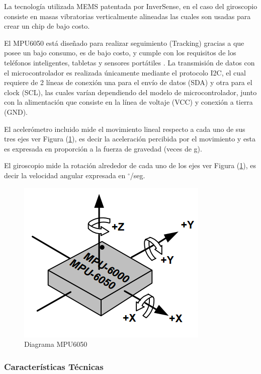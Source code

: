 \documentclass[12pt,a4paper]{article}
\newcommand{\grad}{$^{\circ}$}
\begin{document}
La tecnología utilizada MEMS patentada por InverSense, en el caso del giroscopio consiste en masas vibratorias verticalmente alineadas las cuales son usadas para crear un chip de bajo costo.

El MPU6050 está diseñado para realizar seguimiento (Tracking) gracias a que posee un bajo consumo, es de bajo costo, y cumple con los requisitos de los teléfonos inteligentes, tabletas y sensores portátiles \cite{MPU6050}.
La transmisión de datos con el microcontrolador es realizada únicamente mediante el protocolo I2C, el cual requiere de 2 líneas de conexión una para el envío de datos (SDA) y otra para el clock (SCL), las cuales varían dependiendo del modelo de microcontrolador, junto con la alimentación que consiste en la línea de voltaje (VCC) y conexión a tierra (GND).

El acelerómetro incluido mide el movimiento lineal respecto a cada uno de sus tres ejes ver Figura (\ref{fig:MPU6050}), es decir la aceleración percibida por el movimiento y esta es expresada en proporción a la fuerza de gravedad (veces de g).

El giroscopio mide la rotación alrededor de cada uno de los ejes ver Figura (\ref{fig:MPU6050}), es decir la velocidad angular expresada en \grad/seg.

\begin{figure}[H]
	\centering
	\includegraphics[scale=0.5]{images/MPU6050}
	\caption{Diagrama MPU6050}
	\label{fig:MPU6050}
\end{figure}

\newpage
\subsubsection{Características Técnicas}
\end{document}
